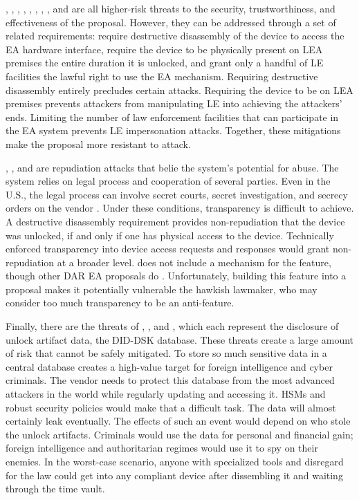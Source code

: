, , , , , , , , and  are all higher-risk threats to the
security, trustworthiness, and effectiveness of the proposal. However, they can be addressed through a set of related
requirements: require destructive disassembly of the device to access the \ac{EA} hardware interface, require the device
to be physically present on LEA premises the entire duration it is unlocked, and grant only a handful of LE facilities
the lawful right to use the \ac{EA} mechanism. Requiring destructive disassembly entirely precludes certain attacks.
Requiring the device to be on LEA premises prevents attackers from manipulating LE into achieving the attackers' ends.
Limiting the number of law enforcement facilities that can participate in the \ac{EA} system prevents LE impersonation
attacks. Together, these mitigations make the proposal more resistant to attack.

, , and  are repudiation attacks that belie the system's potential for abuse. The system relies on
legal process and cooperation of several parties. Even in the U.S., the legal process can involve secret courts, secret
investigation, and secrecy orders on the vendor \cite{shamsi_2011}. Under these conditions, transparency is difficult to
achieve. A destructive disassembly requirement provides non-repudiation that the device was unlocked, if and only if one
has physical access to the device. Technically enforced transparency into device access requests and responses would
grant non-repudiation at a broader level. \ldawmsr does not include a mechanism for the feature, though other \ac{DAR}
\ac{EA} proposals do \cite{phan_key_2017} \cite{servan_schreiber_jje_2020} \cite{goldwasser_public_2017}. Unfortunately,
building this feature into a proposal makes it potentially vulnerable the hawkish lawmaker, who may consider too much
transparency to be an anti-feature.

Finally, there are the threats of , , and , which each represent the disclosure of unlock artifact
data, the DID-DSK database. These threats create a large amount of risk that cannot be safely mitigated. To store so
much sensitive data in a central database creates a high-value target for foreign intelligence and cyber criminals. The
vendor needs to protect this database from the most advanced attackers in the world while regularly updating and
accessing it. \Acp{HSM} and robust security policies would make that a difficult task. The data will almost certainly
leak eventually. The effects of such an event would depend on who stole the unlock artifacts. Criminals would use the
data for personal and financial gain; foreign intelligence and authoritarian regimes would use it to spy on their
enemies. In the worst-case scenario, anyone with specialized tools and disregard for the law could get into any
compliant device after dissembling it and waiting through the time vault.

